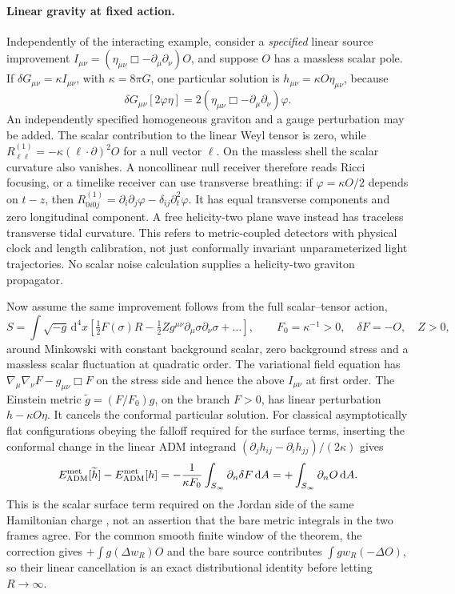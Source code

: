 \documentclass[11pt]{article}
\newcommand{\dd}{\mathrm d}
\newcommand{\Mink}{\eta}
\begin{document}
\paragraph{Linear gravity at fixed action.}
Independently of the interacting example, consider a \emph{specified} linear source improvement
\(I_{\mu\nu}=(\Mink_{\mu\nu}\Box-\partial_\mu\partial_\nu)O\), and suppose \(O\) has a massless scalar pole. If \(\delta G_{\mu\nu}=\kappa I_{\mu\nu}\), with \(\kappa=8\pi G\), one particular solution is \(h_{\mu\nu}=\kappa O\Mink_{\mu\nu}\), because
\[
 \delta G_{\mu\nu}[2\varphi\Mink]=
    2(\Mink_{\mu\nu}\Box-\partial_\mu\partial_\nu)\varphi .
\]
An independently specified homogeneous graviton and a gauge perturbation may be added. The scalar contribution to the linear Weyl tensor is zero, while
\(R^{(1)}_{\ell\ell}=-\kappa(\ell\cdot\partial)^2O\) for a null vector \(\ell\). On the massless shell the scalar curvature also vanishes. A noncollinear null receiver therefore reads Ricci focusing, or a timelike receiver can use transverse breathing: if \(\varphi=\kappa O/2\) depends on \(t-z\), then \(R^{(1)}_{0i0j}=\partial_i\partial_j\varphi-\delta_{ij}\partial_t^2\varphi\). It has equal transverse components and zero longitudinal component. A free helicity-two plane wave instead has traceless transverse tidal curvature. This refers to metric-coupled detectors with physical clock and length calibration, not just conformally invariant unparameterized light trajectories. No scalar noise calculation supplies a helicity-two graviton propagator.

Now assume the same improvement follows from the full scalar--tensor action,
\[
 S=\int\sqrt{-g}\,\dd^4x
       \left[\tfrac12 F(\sigma)R
             -\tfrac12 Z g^{\mu\nu}\partial_\mu\sigma\partial_\nu\sigma
             +\ldots\right],
 \qquad F_0=\kappa^{-1}>0,\quad \delta F=-O,\quad Z>0 ,
\]
around Minkowski with constant background scalar, zero background stress and a massless scalar fluctuation at quadratic order. The variational field equation has \(\nabla_\mu\nabla_\nu F-g_{\mu\nu}\Box F\) on the stress side and hence the above \(I_{\mu\nu}\) at first order. The Einstein metric \(\widetilde g=(F/F_0)g\), on the branch \(F>0\), has linear perturbation \(h-\kappa O\Mink\). It cancels the conformal particular solution. For classical asymptotically flat configurations obeying the falloff required for the surface terms, inserting the conformal change in the linear ADM integrand \((\partial_j h_{ij}-\partial_i h_{jj})/(2\kappa)\) gives
\[
 E_{\rm ADM}^{\rm met}[\widetilde h]-E_{\rm ADM}^{\rm met}[h]
 =-\frac{1}{\kappa F_0}\int_{S_\infty}\partial_n\delta F\,\dd A
 =+\int_{S_\infty}\partial_n O\,\dd A .
\]
This is the scalar surface term required on the Jordan side of the same Hamiltonian charge \cite{DT}, not an assertion that the bare metric integrals in the two frames agree. For the common smooth finite window of the theorem, the correction gives \(+\int g(\Delta w_R)O\) and the bare source contributes \(\int gw_R(-\Delta O)\), so their linear cancellation is an exact distributional identity before letting \(R\to\infty\).
\end{document}
